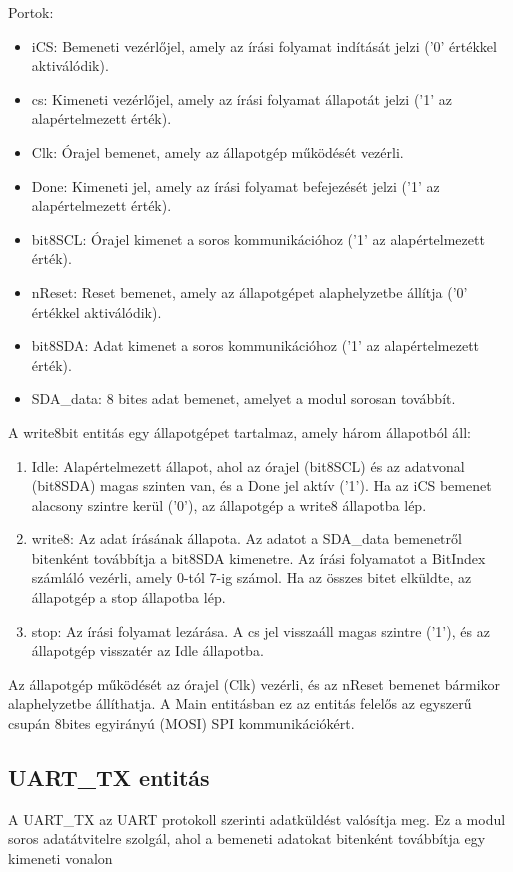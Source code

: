 \documentclass[a4paper,12pt,oneside]{book}
\begin{document}
Portok:
\begin{itemize}
	\item iCS: Bemeneti vezérlőjel, amely az írási folyamat indítását jelzi ('0' értékkel aktiválódik).
	\item cs: Kimeneti vezérlőjel, amely az írási folyamat állapotát jelzi ('1' az alapértelmezett érték).
	\item Clk: Órajel bemenet, amely az állapotgép működését vezérli.
	\item Done: Kimeneti jel, amely az írási folyamat befejezését jelzi ('1' az alapértelmezett érték).
	\item bit8SCL: Órajel kimenet a soros kommunikációhoz ('1' az alapértelmezett érték).
	\item nReset: Reset bemenet, amely az állapotgépet alaphelyzetbe állítja ('0' értékkel aktiválódik).
	\item bit8SDA: Adat kimenet a soros kommunikációhoz ('1' az alapértelmezett érték).
	\item SDA\_data: 8 bites adat bemenet, amelyet a modul sorosan továbbít.
\end{itemize}
A write8bit entitás egy állapotgépet tartalmaz, amely három állapotból áll:
\begin{enumerate}
	\item Idle: Alapértelmezett állapot, ahol az órajel (bit8SCL) és az adatvonal (bit8SDA) magas szinten van, és a Done jel aktív ('1'). Ha az iCS bemenet alacsony szintre kerül ('0'), az állapotgép a write8 állapotba lép.
	\item write8: Az adat írásának állapota. Az adatot a SDA\_data bemenetről bitenként továbbítja a bit8SDA kimenetre. Az írási folyamatot a BitIndex számláló vezérli, amely 0-tól 7-ig számol. Ha az összes bitet elküldte, az állapotgép a stop állapotba lép.
	\item stop: Az írási folyamat lezárása. A cs jel visszaáll magas szintre ('1'), és az állapotgép visszatér az Idle állapotba.
\end{enumerate}
Az állapotgép működését az órajel (Clk) vezérli, és az nReset bemenet bármikor alaphelyzetbe állíthatja. A Main entitásban ez az entitás felelős az egyszerű csupán 8bites egyirányú (MOSI) SPI kommunikációkért. 
\subsection{UART\_TX entitás}
A UART\_TX az UART protokoll szerinti adatküldést valósítja meg. Ez a modul soros adatátvitelre szolgál, ahol a bemeneti adatokat bitenként továbbítja egy kimeneti vonalon
\end{document}
